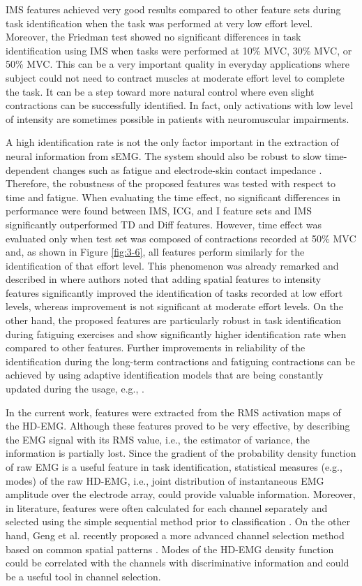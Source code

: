 IMS features achieved very good results compared to other feature sets during task identification when the task was performed at very low effort level. Moreover, the Friedman test showed no significant differences in task identification using IMS when tasks were performed at 10\% MVC, 30\% MVC, or 50\% MVC. This can be a very important quality in everyday applications where subject could not need to contract muscles at moderate effort level to complete the task. It can be a step toward more natural control where even slight contractions can be successfully identified. In fact, only activations with low level of intensity are sometimes possible in patients with neuromuscular impairments.

A high identification rate is not the only factor important in the extraction of neural information from sEMG. The system should also be robust to slow time-dependent changes such as fatigue and electrode-skin contact impedance \citep{Farina2014}. Therefore, the robustness of the proposed features was tested with respect to time and fatigue. When evaluating the time effect, no significant differences in performance were found between IMS, ICG, and I feature sets and IMS significantly outperformed TD and Diff features. However, time effect was evaluated only when test set was composed of contractions recorded at 50\% MVC and, as shown in Figure \ref{fig:3-6}, all features perform similarly for the identification of that effort level. This phenomenon was already remarked and described in \citep{Jordanic2016a} where authors noted that adding spatial features to intensity features significantly improved the identification of tasks recorded at low effort levels, whereas improvement is not significant at moderate effort levels. On the other hand, the proposed features are particularly robust in task identification during fatiguing exercises and show significantly higher identification rate when compared to other features. Further improvements in reliability of the identification during the long-term contractions and fatiguing contractions can be achieved by using adaptive identification models that are being constantly updated during the usage, e.g., \citep{Vidovic2016, Hahne2015, Sensinger2009}.

In the current work, features were extracted from the RMS activation maps of the HD-EMG. Although these features proved to be very effective, by describing the EMG signal with its RMS value, i.e., the estimator of variance, the information is partially lost. Since the gradient of the probability density function of raw EMG is a useful feature in task identification, statistical measures (e.g., modes) of the raw HD-EMG, i.e., joint distribution of instantaneous EMG amplitude over the electrode array, could provide valuable information. Moreover, in literature, features were often calculated for each channel separately and selected using the simple sequential method prior to classification \citep{Hargrove2009, Li2017}. On the other hand, Geng et al. recently proposed a more advanced channel selection method based on common spatial patterns \citep{Geng2014}. Modes of the HD-EMG density function could be correlated with the channels with discriminative information and could be a useful tool in channel selection.

